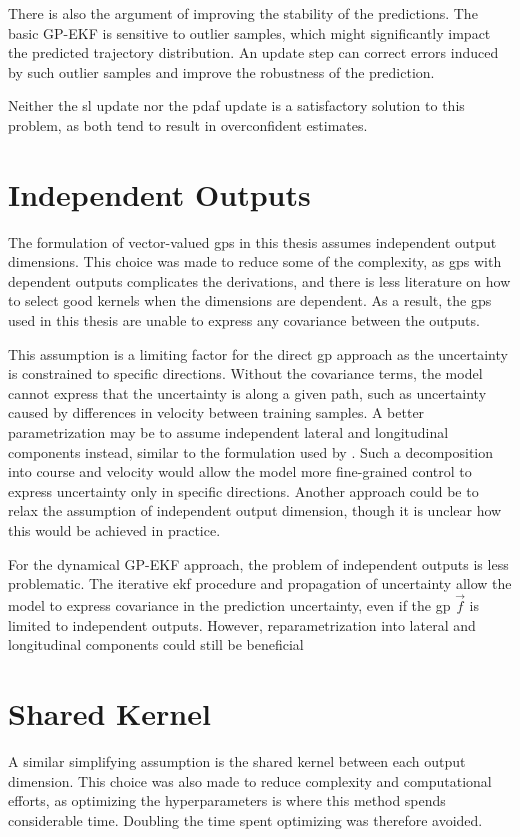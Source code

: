 There is also the argument of improving the stability of the predictions. The basic GP-EKF is sensitive to outlier samples, which might significantly impact the predicted trajectory distribution. An update step can correct errors induced by such outlier samples and improve the robustness of the prediction. 

Neither the \acrshort{sl} update nor the \acrshort{pdaf} update is a satisfactory solution to this problem, as both tend to result in overconfident estimates.  



\section{Independent Outputs}
The formulation of vector-valued \acrshort{gp}s in this thesis assumes independent output dimensions. This choice was made to reduce some of the complexity, as \acrshort{gp}s with dependent outputs complicates the derivations, and there is less literature on how to select good kernels when the dimensions are dependent. As a result, the \acrshort{gp}s used in this thesis are unable to express any covariance between the outputs. 

This assumption is a limiting factor for the direct \acrshort{gp} approach as the uncertainty is constrained to specific directions. Without the covariance terms, the model cannot express that the uncertainty is along a given path, such as uncertainty caused by differences in velocity between training samples. A better parametrization may be to assume independent lateral and longitudinal components instead, similar to the formulation used by \cite{gp_ais_trajectory}. Such a decomposition into course and velocity would allow the model more fine-grained control to express uncertainty only in specific directions. Another approach could be to relax the assumption of independent output dimension, though it is unclear how this would be achieved in practice. 

For the dynamical GP-EKF approach, the problem of independent outputs is less problematic. The iterative \acrshort{ekf} procedure and propagation of uncertainty allow the model to express covariance in the prediction uncertainty, even if the \acrshort{gp} $\vec{f}$ is limited to independent outputs. However, reparametrization into lateral and longitudinal components could still be beneficial

\section{Shared Kernel}
A similar simplifying assumption is the shared kernel between each output dimension. This choice was also made to reduce complexity and computational efforts, as optimizing the hyperparameters is where this method spends considerable time. Doubling the time spent optimizing was therefore avoided. 

